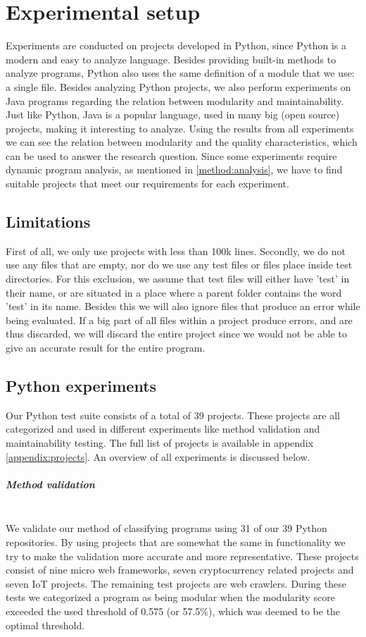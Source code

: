 \documentclass[twoside]{uva-inf-bachelor-thesis}
\newcommand{\myparagraph}[1]{\paragraph{#1}\mbox{}\\}
\begin{document}
\chapter{Experimental setup}
Experiments are conducted on projects developed in Python, since Python is a modern and easy to analyze language. Besides providing built-in methods to analyze programs, Python also uses the same definition of a module that we use: a single file. Besides analyzing Python projects, we also perform experiments on Java programs regarding the relation between modularity and maintainability. Just like Python, Java is a popular language, used in many big (open source) projects, making it interesting to analyze. Using the results from all experiments we can see the relation between modularity and the quality characteristics, which can be used to answer the research question. Since some experiments require dynamic program analysis, as mentioned in \autoref{method:analysis}, we have to find suitable projects that meet our requirements for each experiment.

\section{Limitations}
First of all, we only use projects with less than 100k lines. Secondly, we do not use any files that are empty, nor do we use any test files or files place inside test directories. For this exclusion, we assume that test files will either have 'test' in their name, or are situated in a place where a parent folder contains the word 'test' in its name. Besides this we will also ignore files that produce an error while being evaluated. If a big part of all files within a project produce errors, and are thus discarded, we will discard the entire project since we would not be able to give an accurate result for the entire program.

\section{Python experiments}
Our Python test suite consists of a total of 39 projects. These projects are all categorized and used in different experiments like method validation and maintainability testing. The full list of projects is available in appendix \ref{appendix:projects}. An overview of all experiments is discussed below.

\myparagraph{Method validation}
We validate our method of classifying programs using 31 of our 39 Python repositories. By using projects that are somewhat the same in functionality we try to make the validation more accurate and more representative. These projects consist of nine micro web frameworks, seven cryptocurrency related projects and seven IoT projects. The remaining test projects are web crawlers. During these tests we categorized a program as being modular when the modularity score exceeded the used threshold of 0.575 (or 57.5\%), which was deemed to be the optimal threshold.
\end{document}
